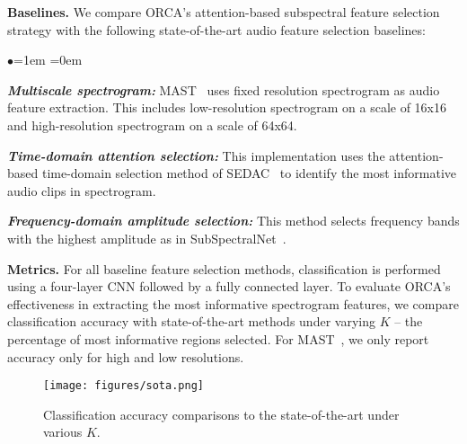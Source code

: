 \noindent
\textbf{Baselines.}
We compare ORCA's attention-based subspectral feature selection strategy with the following state-of-the-art audio feature selection baselines:

\begin{list}{$\bullet$}{\leftmargin=1em \itemindent=0em}
\item \textbf{\textit{Multiscale spectrogram:} } MAST~\cite{zhu2023multiscale} uses fixed resolution spectrogram as audio feature extraction. This includes low-resolution spectrogram on a scale of 16x16 and high-resolution spectrogram on a scale of 64x64. 

\item \textbf{\textit{Time-domain attention selection:} } This implementation uses the attention-based time-domain selection method of SEDAC~\cite{ahn2024split} to identify the most informative audio clips in spectrogram.

\item \textbf{\textit{Frequency-domain amplitude selection:} } This method selects frequency bands with the highest amplitude as in SubSpectralNet~\cite{phaye2019subspectralnet}.
\end{list}

\noindent
\textbf{Metrics.}
For all baseline feature selection methods, classification is performed using a four-layer CNN followed by a fully connected layer. To evaluate ORCA’s effectiveness in extracting the most informative spectrogram features, we compare classification accuracy with state-of-the-art methods under varying $K$ -- the percentage of most informative regions selected. For MAST~\cite{zhu2023multiscale}, we only report accuracy only for high and low resolutions.


\begin{figure}[tp]
    \centering
    \texttt{[image: figures/sota.png]}
    \vspace{-0.6cm}
    \caption{Classification accuracy comparisons to the state-of-the-art under various $K$.}
    \label{fig:sota}
    \vspace{-0.4cm}
\end{figure}

